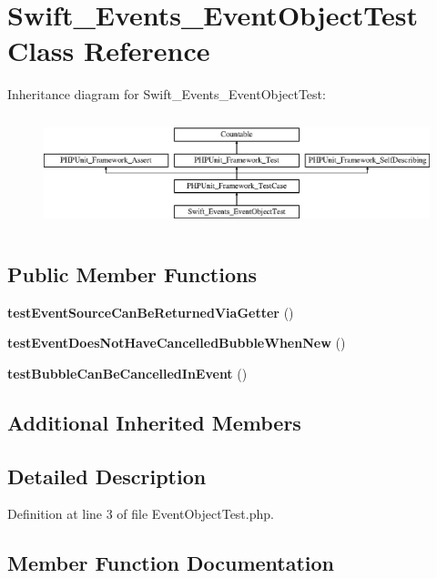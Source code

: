 \section{Swift\+\_\+\+Events\+\_\+\+Event\+Object\+Test Class Reference}
\label{class_swift___events___event_object_test}
Inheritance diagram for Swift\+\_\+\+Events\+\_\+\+Event\+Object\+Test\+:\begin{figure}[H]
\begin{center}
\leavevmode
\includegraphics[height=3.303835cm]{class_swift___events___event_object_test}
\end{center}
\end{figure}
\subsection*{Public Member Functions}
\begin{DoxyCompactItemize}
\item 
{\bf test\+Event\+Source\+Can\+Be\+Returned\+Via\+Getter} ()
\item 
{\bf test\+Event\+Does\+Not\+Have\+Cancelled\+Bubble\+When\+New} ()
\item 
{\bf test\+Bubble\+Can\+Be\+Cancelled\+In\+Event} ()
\end{DoxyCompactItemize}
\subsection*{Additional Inherited Members}


\subsection{Detailed Description}


Definition at line 3 of file Event\+Object\+Test.\+php.



\subsection{Member Function Documentation}
